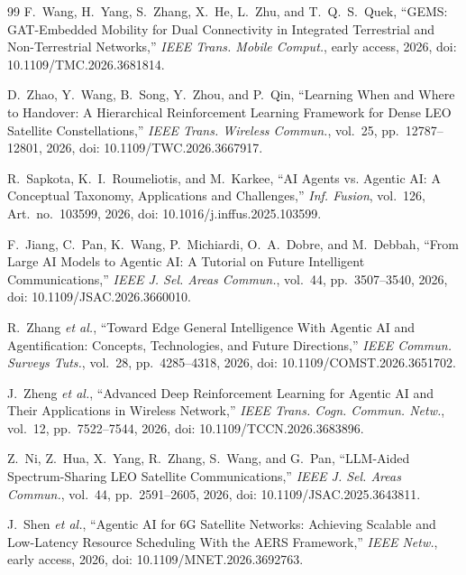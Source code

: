 \documentclass[journal]{IEEEtran}
\begin{document}
\begin{thebibliography}{99}
F.~Wang, H.~Yang, S.~Zhang, X.~He, L.~Zhu, and T.~Q.~S.~Quek, ``GEMS: GAT-Embedded Mobility for Dual Connectivity in Integrated Terrestrial and Non-Terrestrial Networks,'' \emph{IEEE Trans. Mobile Comput.}, early access, 2026, doi: 10.1109/TMC.2026.3681814.

D.~Zhao, Y.~Wang, B.~Song, Y.~Zhou, and P.~Qin, ``Learning When and Where to Handover: A Hierarchical Reinforcement Learning Framework for Dense LEO Satellite Constellations,'' \emph{IEEE Trans. Wireless Commun.}, vol.~25, pp.~12787--12801, 2026, doi: 10.1109/TWC.2026.3667917.

R.~Sapkota, K.~I.~Roumeliotis, and M.~Karkee, ``AI Agents vs. Agentic AI: A Conceptual Taxonomy, Applications and Challenges,'' \emph{Inf. Fusion}, vol.~126, Art.~no.~103599, 2026, doi: 10.1016/j.inffus.2025.103599.

F.~Jiang, C.~Pan, K.~Wang, P.~Michiardi, O.~A.~Dobre, and M.~Debbah, ``From Large AI Models to Agentic AI: A Tutorial on Future Intelligent Communications,'' \emph{IEEE J. Sel. Areas Commun.}, vol.~44, pp.~3507--3540, 2026, doi: 10.1109/JSAC.2026.3660010.

R.~Zhang \emph{et al.}, ``Toward Edge General Intelligence With Agentic AI and Agentification: Concepts, Technologies, and Future Directions,'' \emph{IEEE Commun. Surveys Tuts.}, vol.~28, pp.~4285--4318, 2026, doi: 10.1109/COMST.2026.3651702.

J.~Zheng \emph{et al.}, ``Advanced Deep Reinforcement Learning for Agentic AI and Their Applications in Wireless Network,'' \emph{IEEE Trans. Cogn. Commun. Netw.}, vol.~12, pp.~7522--7544, 2026, doi: 10.1109/TCCN.2026.3683896.

Z.~Ni, Z.~Hua, X.~Yang, R.~Zhang, S.~Wang, and G.~Pan, ``LLM-Aided Spectrum-Sharing LEO Satellite Communications,'' \emph{IEEE J. Sel. Areas Commun.}, vol.~44, pp.~2591--2605, 2026, doi: 10.1109/JSAC.2025.3643811.

J.~Shen \emph{et al.}, ``Agentic AI for 6G Satellite Networks: Achieving Scalable and Low-Latency Resource Scheduling With the AERS Framework,'' \emph{IEEE Netw.}, early access, 2026, doi: 10.1109/MNET.2026.3692763.


\end{thebibliography}
\end{document}
